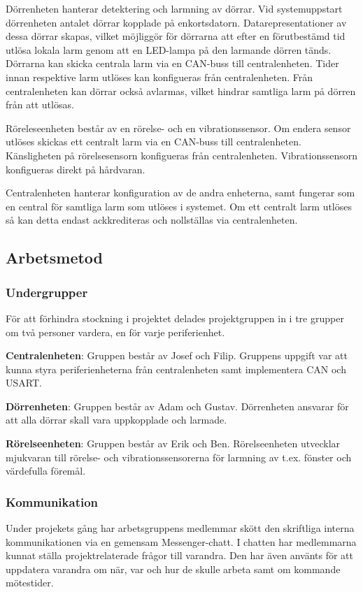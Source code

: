 \documentclass{article}
\begin{document}
Dörrenheten hanterar detektering och larmning av dörrar. Vid systemuppstart 
dörrenheten antalet dörrar kopplade på enkortsdatorn. Datarepresentationer av
  dessa dörrar skapas, vilket möjliggör för dörrarna att efter en förutbestämd 
  tid utlösa lokala larm genom att en LED-lampa på den larmande dörren tänds. 
  Dörrarna kan skicka centrala larm via en CAN-buss till 
  centralenheten. Tider innan respektive larm utlöses kan konfigueras från centralenheten. 
  Från centralenheten kan dörrar också avlarmas, vilket hindrar 
  samtliga larm på dörren från att utlösas.

Röreleseenheten består av en rörelse- och en vibrationssensor. Om endera sensor 
utlöses skickas ett centralt larm via en CAN-buss till centralenheten. Känsligheten 
på rörelsesensorn konfigueras från centralenheten. Vibrationssensorn konfigueras direkt på hårdvaran.

Centralenheten hanterar konfiguration av de andra enheterna, samt fungerar som en 
central för samtliga larm som utlöses i systemet. Om ett centralt larm utlöses så 
kan detta endast ackkrediteras och nollställas via centralenheten.

\subsection{Arbetsmetod} %
\subsubsection{Undergrupper}
För att förhindra stockning i projektet delades projektgruppen in i tre grupper om två personer vardera, 
en för varje periferienhet.

\textbf{Centralenheten}: Gruppen består av Josef och Filip. Gruppens uppgift var att kunna styra periferienheterna från centralenheten samt implementera CAN och USART.

\textbf{Dörrenheten}: Gruppen består av Adam och Gustav. Dörrenheten ansvarar för att alla dörrar 
skall vara uppkopplade och larmade.

\textbf{Rörelseenheten}: Gruppen består av Erik och Ben. Rörelseenheten utvecklar mjukvaran till 
rörelse- och vibrationssensorerna för larmning av t.ex. fönster och värdefulla föremål.

\subsubsection{Kommunikation}
Under projekets gång har arbetsgruppens medlemmar skött den skriftliga interna kommunikationen via en gemensam Messenger-chatt.
I chatten har medlemmarna kunnat ställa projektrelaterade
frågor till varandra. Den har även använts för att uppdatera varandra om när, var och hur de skulle arbeta samt om kommande mötestider.
\end{document}
